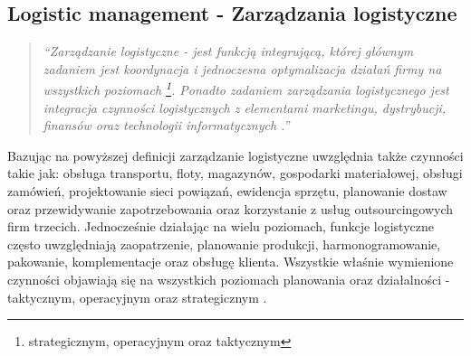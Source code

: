 	\subsection{Logistic management - Zarządzania logistyczne}
		\begin{quote}
			\textit{
				``\emph{Zarządzanie logistyczne} - jest funkcją integrującą, której głównym zadaniem jest
				koordynacja i jednoczesna optymalizacja działań firmy na wszystkich poziomach
				\footnote{strategicznym, operacyjnym oraz taktycznym}. Ponadto zadaniem \emph{zarządzania logistycznego} jest
				integracja czynności logistycznych z elementami marketingu, dystrybucji, finansów oraz technologii
				informatycznych \cite{csmp_logistic_management}.''
			}
		\end{quote}
		
		Bazując na powyższej definicji zarządzanie logistyczne uwzględnia także czynności takie jak:
		obsługa transportu, floty, magazynów, gospodarki materiałowej, obsługi zamówień, 
		projektowanie sieci powiązań, ewidencja sprzętu,
		planowanie dostaw oraz przewidywanie zapotrzebowania oraz korzystanie z 
		usług outsourcingowych firm trzecich. Jednocześnie działając na wielu poziomach, 
		funkcje logistyczne często uwzględniają zaopatrzenie, planowanie produkcji, harmonogramowanie, 
		pakowanie, komplementacje oraz obsługę klienta. Wszystkie właśnie wymienione czynności
		objawiają się na wszystkich poziomach planowania oraz działalności - taktycznym, operacyjnym oraz
		strategicznym \cite{csmp_logistic_management}.

